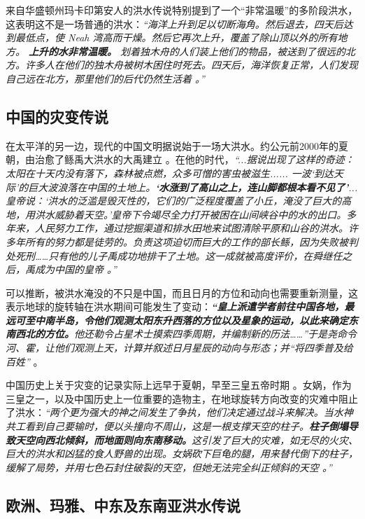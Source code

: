 \documentclass[10pt,twocolumn,letterpaper]{article}
\begin{document}
来自华盛顿州玛卡印第安人的洪水传说特别提到了一个“非常温暖”的多阶段洪水，这表明这不是一场普通的洪水：\textit{“海洋上升到足以切断海角。然后退去，四天后达到最低点，使 Neah 湾高而干燥。然后它再次上升，覆盖了除山顶以外的所有地方。 \textbf{上升的水非常温暖。} 划着独木舟的人们装上他们的物品，被送到了很远的北方。许多人在他们的独木舟被树木困住时死去。四天后，海洋恢复正常，人们发现自己远在北方，那里他们的后代仍然生活着 \cite{3}。”}

\subsection{中国的灾变传说}

在太平洋的另一边，现代的中国文明据说始于一场大洪水。约公元前2000年的夏朝，由治愈了鲧禹大洪水的大禹建立 \cite{6}。在他的时代，\textit{“...据说出现了这样的奇迹：太阳在十天内没有落下，森林被点燃，众多可憎的害虫被滋生...... 一波‘到达天际’的巨大波浪落在中国的土地上。\textbf{‘水涨到了高山之上，连山脚都根本看不见了’}...皇帝说：‘洪水的泛滥是毁灭性的，它们的广泛程度覆盖了小丘，淹没了巨大的高地，用洪水威胁着天空。’皇帝下令竭尽全力打开被困在山间峡谷中的水的出口。多年来，人民努力工作，通过挖掘渠道和排水田地来试图清除平原和山谷的洪水。许多年所有的努力都是徒劳的。负责这项迫切而巨大的工作的部长鲧，因为失败被判处死刑……只有他的儿子禹成功地排干了土地。这一成就被高度评价，在舜继任之后，禹成为中国的皇帝 \cite{5}。”}

可以推断，被洪水淹没的不只是中国，而且日月的方位和动向也需要重新测量，这表示地球的旋转轴在洪水期间可能发生了变动：\textit{\textbf{“皇上派遣学者前往中国各地，最远可至中南半岛，令他们观测太阳东升西落的方位以及星象的运动，以此来确定东南西北的方位。}他还勒令占星术士摸索四季周期，并编制新的历法……”于是尧命令河、霍，让他们观测上天，计算并叙述日月星辰的动向与形态；并“将四季普及给百姓”} \cite{5}。

中国历史上关于灾变的记录实际上远早于夏朝，早至三皇五帝时期 \cite{7}。女娲，作为三皇之一，以及中国历史上一位重要的造物主，在地球旋转方向改变的灾难中阻止了洪水：\textit{“两个更为强大的神之间发生了争执，他们决定通过战斗来解决。当水神共工看到自己要输时，便以头撞向不周山，这是一根支撑天空的柱子。\textbf{柱子倒塌导致天空向西北倾斜，而地面则向东南移动。}这引发了巨大的灾难，如无尽的火灾、巨大的洪水和凶猛的食人野兽的出现。女娲砍下巨龟的腿，用来替代倒下的柱子，缓解了局势，并用七色石封住破裂的天空，但她无法完全纠正倾斜的天空 \cite{8}。”}

\subsection{欧洲、玛雅、中东及东南亚洪水传说}
\end{document}
